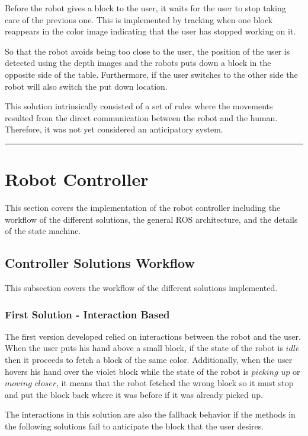 {Before the robot gives a block to the user, it waits for the user to stop taking care of the previous one. This is implemented by tracking when one block reappears in the color image indicating that the user has stopped working on it.

So that the robot avoids being too close to the user, the position of the user is detected using the depth images and the robots puts down a block in the opposite side of the table. Furthermore, if the user switches to the other side the robot will also switch the put down location.

This solution intrinsically consisted of a set of rules where the movements resulted from the direct communication between the robot and the human. Therefore, it was not yet considered an anticipatory system.
}
{\color{red} \rule{\linewidth}{0.5mm}}

\fi

\section{Robot Controller}

This section covers the implementation of the robot controller including the workflow of the different solutions, the general ROS architecture, and the details of the state machine.

\subsection{Controller Solutions Workflow}

This subsection covers the workflow of the different solutions implemented.

\subsubsection{First Solution - Interaction Based}

The first version developed relied on interactions between the robot and the user. When the user puts his hand above a small block, if the state of the robot is $idle$ then it proceeds to fetch a block of the same color. Additionally, when the user hovers his hand over the violet block while the state of the robot is $picking$ $up$ or $moving$ $closer$, it means that the robot fetched the wrong block so it must stop and put the block back where it was before if it was already picked up.

The interactions in this solution are also the fallback behavior if the methods in the following solutions fail to anticipate the block that the user desires.

